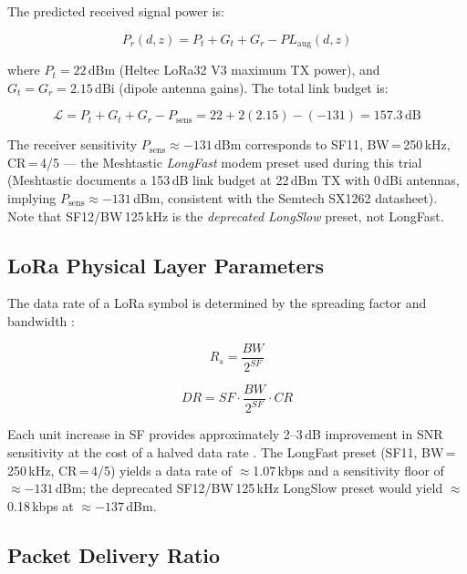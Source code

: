\documentclass[11pt,letterpaper]{article}
\begin{document}
The predicted received signal power is:

\begin{equation}
  P_r(d, z) = P_t + G_t + G_r - PL_{\mathrm{aug}}(d, z)
  \label{eq:rxpower}
\end{equation}

where $P_t = 22$\,dBm (Heltec LoRa32 V3 maximum TX power), and $G_t = G_r = 2.15$\,dBi
(dipole antenna gains). The total link budget is:

\begin{equation}
  \mathcal{L} = P_t + G_t + G_r - P_{\mathrm{sens}} = 22 + 2(2.15) - (-131) = 157.3\,\mathrm{dB}
  \label{eq:budget}
\end{equation}

The receiver sensitivity $P_{\mathrm{sens}} \approx -131$\,dBm corresponds to SF11,
BW\,=\,250\,kHz, CR\,=\,4/5 --- the Meshtastic \textit{LongFast} modem preset used during
this trial (Meshtastic documents a 153\,dB link budget at 22\,dBm TX with 0\,dBi antennas,
implying $P_{\mathrm{sens}} \approx -131$\,dBm, consistent with the Semtech SX1262
datasheet). Note that SF12/BW\,125\,kHz is the \emph{deprecated LongSlow} preset, not
LongFast.

\subsection{LoRa Physical Layer Parameters}

The data rate of a LoRa symbol is determined by the spreading factor and bandwidth
\cite{pdr2021}:

\begin{equation}
  R_s = \frac{BW}{2^{SF}}
  \label{eq:symrate}
\end{equation}

\begin{equation}
  DR = SF \cdot \frac{BW}{2^{SF}} \cdot CR
  \label{eq:datarate}
\end{equation}

Each unit increase in SF provides approximately 2--3\,dB improvement in SNR sensitivity
at the cost of a halved data rate \cite{pdr2021}. The LongFast preset (SF11,
BW\,=\,250\,kHz, CR\,=\,4/5) yields a data rate of $\approx$1.07\,kbps and a sensitivity
floor of $\approx -131$\,dBm; the deprecated SF12/BW\,125\,kHz LongSlow preset would
yield $\approx$0.18\,kbps at $\approx -137$\,dBm.

\subsection{Packet Delivery Ratio}
\end{document}

